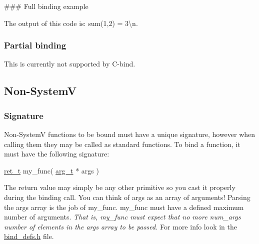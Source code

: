 \#\#\# Full binding example 
 The output of this code is\+: {\ttfamily sum(1,2) = 3\textbackslash{}n}.

\subsubsection*{Partial binding}

This is currently not supported by {\ttfamily C-\/bind}.

\subsection*{Non-\/\+SystemV}

\subsubsection*{Signature}

Non-\/\+SystemV functions to be bound must have a unique signature, however when calling them they may be called as standard functions. To bind a function, it must have the following signature\+: 
\begin{DoxyCode}
\hyperlink{bind__defs_8h_a54aeeb54a7a6a62c72ec8dc7718fdd91}{ret\_t} my\_func( \hyperlink{bind__defs_8h_aa409ee08129c587e002cf2062a09a744}{arg\_t} * args )
\end{DoxyCode}
 The return value may simply be any other primitive so you cast it properly during the binding call. You can think of {\ttfamily args} as an array of arguments! Parsing the {\ttfamily args} array is the job of {\ttfamily my\+\_\+func}. {\ttfamily my\+\_\+func} must have a defined maximum number of \textquotesingle{}arguments\textquotesingle{}. {\itshape That is, {\ttfamily my\+\_\+func} must expect that no more {\ttfamily num\+\_\+args} number of elements in the {\ttfamily args} array to be passed.} For more info look in the {\ttfamily \hyperlink{bind__defs_8h}{bind\+\_\+defs.\+h}} file.

